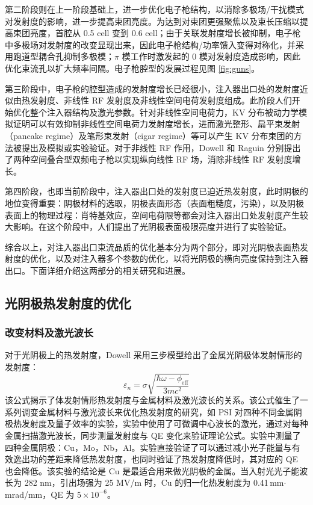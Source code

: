 第二阶段则在上一阶段基础上，进一步优化电子枪结构，以消除多极场/干扰模式对发射度的影响，进一步提高束团亮度。为达到对束团更强聚焦以及束长压缩以提高束团亮度，首腔从 0.5 cell 变到 0.6 cell\cite{Lehrman:1992aa}；由于关联发射度增长被抑制，电子枪中多极场对发射度的改变显现出来，因此电子枪结构/功率馈入变得对称化\cite{Palmer:1998aa}，并采用跑道型耦合孔抑制多极模\cite{Limborg:2005vn, Akre:2008aa}；$\pi$ 模工作时激发起的 0 模对发射度造成影响，因此优化束流孔以扩大频率间隔\cite{Palmer:1998aa}。电子枪腔型的发展过程见图 \ref{fig:guns}。

第三阶段中，电子枪的腔型造成的发射度增长已经很小，注入器出口处的发射度近似由热发射度、非线性 RF 发射度及非线性空间电荷发射度组成\cite{Qiu:1996aa}。此阶段人们开始优化整个注入器结构及激光参数。针对非线性空间电荷力，KV 分布\cite{Kapchinskij:1959aa}被动力学模拟证明可以有效抑制非线性空间电荷力发射度增长\cite{Limborg-Deprey:2006aa,Khojoyan:2013aa}，进而激光整形、扁平束发射（pancake regime）\cite{bazarov2009maximum}及笔形束发射（cigar regime）\cite{filippetto2014maximum}等可以产生 KV 分布束团的方法被提出及模拟或实验验证\cite{Khojoyan:2013aa,Khojoyan:2014aa,Musumeci:2008ab,Li:2012aa}。对于非线性 RF 作用，Dowell 和 Raguin 分别提出了两种空间叠合型双频电子枪\cite{Dowell:2004aa,Raguin:2005aa}以实现纵向线性 RF 场，消除非线性 RF 发射度增长。

第四阶段，也即当前阶段中，注入器出口处的发射度已迫近热发射度\cite{li2012multi,gulliford2013demonstration,karkare2011effect,}，此时阴极的地位变得重要：阴极材料的选取\cite{Cultrera:2014ab}，阴极表面形态（表面粗糙度，污染）\cite{Vecchione:2012aa,Vecchione:2013aa,Ling:2013aa}，以及阴极表面上的物理过程：肖特基效应，空间电荷限等都会对注入器出口处发射度产生较大影响\cite{qian2012experimental}。在这个阶段中，人们提出了光阴极表面极限亮度并进行了实验验证\cite{bazarov2009maximum,filippetto2014maximum}。

综合以上，对注入器出口束流品质的优化基本分为两个部分，即对光阴极表面热发射度的优化，以及对注入器多个参数的优化，以将光阴极的横向亮度保持到注入器出口。下面详细介绍这两部分的相关研究和进展。

\subsection{光阴极热发射度的优化}
\subsubsection{改变材料及激光波长}
对于光阴极上的热发射度，Dowell 采用三步模型给出了金属光阴极体发射情形的发射度\cite{Dowell:2006aa,dowell2009quantum}：
\[
	\varepsilon_{n} =\sigma\sqrt{\dfrac{\hbar\omega-\phi_{\mathrm{eff}}}{3mc^2}}
\]
该公式揭示了体发射情形热发射度与金属材料及激光波长的关系。该公式催生了一系列调变金属材料与激光波长来优化热发射度的研究，如 PSI 对四种不同金属阴极热发射度及量子效率的实验\cite{hauri2010intrinsic}，实验中使用了可微调中心波长的激光，通过对每种金属扫描激光波长，同步测量发射度与 QE 变化来验证理论公式。实验中测量了四种金属阴极：Cu，Mo，Nb，Al。实验直接验证了可以通过减小光子能量与有效逸出功的差距来降低热发射度，也同时验证了热发射度降低时，其对应的 QE 也会降低。该实验的结论是 Cu 是最适合用来做光阴极的金属。当入射光光子能波长为 282 nm，引出场强为 25 MV/m  时，Cu 的归一化热发射度为 0.41\,mm$\cdot$mrad/mm，QE 为 $5\times10^{-6}$。


